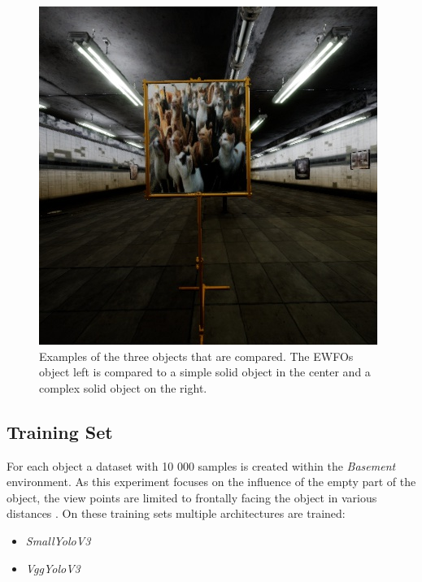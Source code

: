 \begin{figure}[hbtp]
\begin{minipage}{0.3\textwidth}
	\end{minipage}
	\begin{minipage}{0.3\textwidth}
		\includegraphics[width=\textwidth]{fig/cats}
	\end{minipage}
	\caption{Examples of the three objects that are compared. The \acp{EWFO} object left is compared to a simple solid object in the center and a complex solid object on the right.}
	\label{fig:cats}
\end{figure}

\subsection{Training Set}

For each object a dataset with 10 000 samples is created within the \textit{Basement} environment. As this experiment focuses on the influence of the empty part of the object, the view points are limited to frontally facing the object in various distances . On these training sets multiple architectures are trained: 

\begin{itemize}
	\item \textit{SmallYoloV3}
	\item \textit{VggYoloV3}
\end{itemize}



